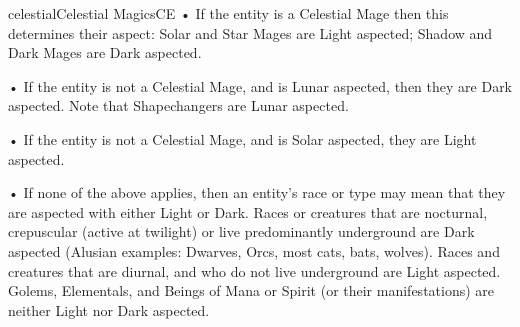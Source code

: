 \begin{College}[1.3]{celestial}{Celestial Magics}{CE}
• If the entity is a Celestial Mage then this determines their
aspect: Solar and Star Mages are Light aspected; Shadow and Dark Mages
are Dark aspected.

• If the entity is not a Celestial Mage, and is Lunar aspected, then
they are Dark aspected.  Note that Shapechangers are Lunar aspected.

• If the entity is not a Celestial Mage, and is Solar aspected, they
are Light aspected.

• If none of the above applies, then an entity’s race or type may mean
that they are aspected with either Light or Dark.  Races or creatures
that are nocturnal, crepuscular (active at twilight) or live
predominantly underground are Dark aspected (Alusian examples:
Dwarves, Orcs, most cats, bats, wolves).  Races and creatures that are
diurnal, and who do not live underground are Light aspected.  Golems,
Elementals, and Beings of Mana or Spirit (or their manifestations) are
neither Light nor Dark aspected.
\end{College}

